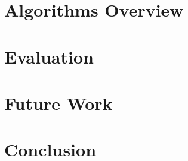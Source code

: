 \documentclass[a4paper, 11pt]{article}
\begin{document}
\section{Algorithms Overview}


\section{Evaluation}


\section{Future Work}

\label{FutureWork}

\section{Conclusion}


\clearpage


\end{document}
